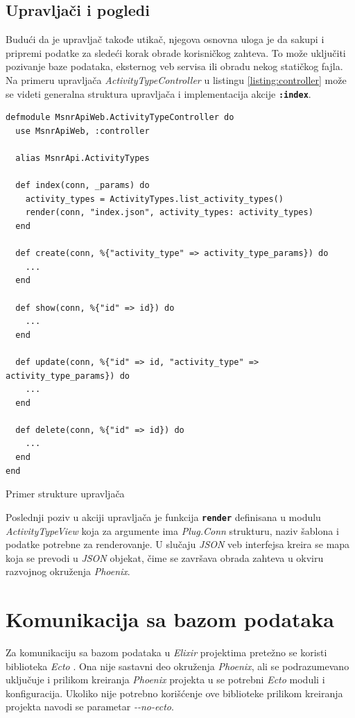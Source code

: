 \documentclass[12pt,oneside]{memoir}
\begin{document}
\subsection{Upravljači i pogledi}
Budući da je upravljač takođe utikač, njegova osnovna uloga je da sakupi i pripremi podatke za sledeći korak obrade korisničkog zahteva.
To može uključiti pozivanje baze podataka, eksternog veb servisa ili obradu nekog statičkog fajla. 
Na primeru upravljača \emph{ActivityTypeController} u listingu \ref{listing:controller} može se videti generalna struktura upravljača
i implementacija akcije \texttt{\textbf{:index}}.
\begin{listing}[!h]
\begin{verbatim}
defmodule MsnrApiWeb.ActivityTypeController do
  use MsnrApiWeb, :controller

  alias MsnrApi.ActivityTypes

  def index(conn, _params) do
    activity_types = ActivityTypes.list_activity_types()
    render(conn, "index.json", activity_types: activity_types)
  end

  def create(conn, %{"activity_type" => activity_type_params}) do
    ...
  end

  def show(conn, %{"id" => id}) do
    ...
  end

  def update(conn, %{"id" => id, "activity_type" => activity_type_params}) do
    ...
  end

  def delete(conn, %{"id" => id}) do
    ...
  end
end
\end{verbatim}
\caption{Primer strukture upravljača}
\label{listing:controller}
\end{listing}

Poslednji poziv u akciji upravljača je funkcija \texttt{\textbf{render}} definisana u modulu \emph{ActivityTypeView} koja za argumente ima \emph{Plug.Conn} strukturu,
naziv šablona i podatke potrebne za renderovanje. U slučaju \emph{JSON} veb interfejsa kreira se mapa koja se prevodi u \emph{JSON} objekat,
čime se završava obrada zahteva u okviru razvojnog okruženja \emph{Phoenix}. 

\section{Komunikacija sa bazom podataka}
Za komunikaciju sa bazom podataka u \emph{Elixir} projektima pretežno se koristi biblioteka \emph{Ecto} \cite{ecto}.
Ona nije sastavni deo okruženja \emph{Phoenix}, ali se podrazumevano uključuje i prilikom kreiranja
\emph{Phoenix} projekta u se potrebni \emph{Ecto} moduli i konfiguracija. Ukoliko nije potrebno
korišćenje ove biblioteke prilikom kreiranja projekta navodi se parametar \emph{-{}-no-ecto}.
\end{document}
